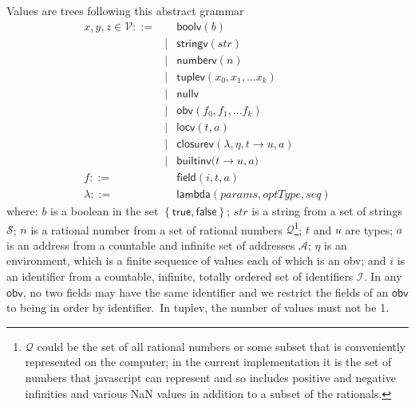 \documentclass[12pt]{article}
\begin{document}
Values are trees following this abstract grammar%
\begin{eqnarray*}
x,y,z\in \mathcal{V} ::=&&\mathsf{boolv}\left( b\right) \\
&\mid &\mathsf{stringv}\left( \mathit{str}\right) \\
&\mid &\mathsf{numberv}\left( n\right) \\
&\mid &\mathsf{tuplev}\left( x_{0},x_{1},\ldots x_{k}\right) \\
&\mid &\mathsf{nullv} \\
&\mid &\mathsf{obv}\left( f_{0},f_{1},...f_{k}\right) \\
&\mid &\mathsf{locv}\left( t,a\right) \\
&\mid &\mathsf{closurev}\left( \lambda ,\eta ,t\rightarrow u,a\right) \\
&\mid &\mathsf{builtinv(}t\rightarrow u,a) \\
f ::=&&\mathsf{field}(i,t,a) \\
\lambda ::=&&\mathsf{lambda}(\mathit{params},\mathit{optType,seq})
\end{eqnarray*}%
where: $b$ is a boolean in the set $\left\{ \mathsf{true,false}\right\} $; $%
\mathit{str}$ is a string from a set of strings $\mathcal{S}$; $n$ is a
rational number from a set of rational numbers $\mathcal{Q}$\footnote{$%
\mathcal{Q}$ could be the set of all rational numbers or some subset that is
conveniently represented on the computer; in the current implementation it
is the set of numbers that javascript can represent and so includes positive
and negative infinities and various NaN values in addition to a subset of
the rationals.}; $t$ and $u$ are types; $a$ is an address from a countable
and infinite set of addresses $\mathcal{A}$; $\eta $ is an environment,
which is a finite sequence of values each of which is an \textsf{obv}; and $%
i $ is an identifier from a countable, infinite, totally ordered set of
identifiers $\mathcal{I}$. In any $\mathsf{obv}$, no two fields may have the
same identifier and we restrict the fields of an $\mathsf{obv}$ to being in
order by identifier.\ In \textsf{tuplev}, the number of values must not be 1.
\end{document}
